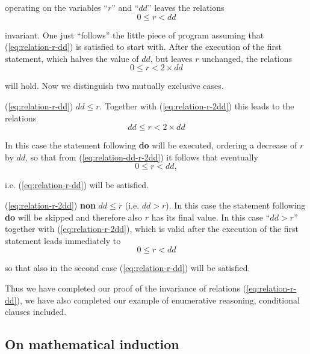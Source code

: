 \noindent
operating on the variables ``$r$'' and ``$dd$'' leaves the relations
\begin{equation}
	\label{eq:relation-r-dd}
	0 \leqslant r < dd
\end{equation}

\noindent
invariant. One just ``follows'' the little piece of program assuming that (\ref{eq:relation-r-dd}) is satisfied to start with. After the execution of the first statement, which halves the value of $dd$, but leaves $r$ unchanged, the relations
\begin{equation}
	\label{eq:relation-r-2dd}
	0 \leqslant r < 2\times dd
\end{equation}

\noindent
will hold. Now we distinguish two mutually exclusive cases.

(\ref{eq:relation-r-dd}) $dd \leqslant r$. Together with (\ref{eq:relation-r-2dd}) this leads to the relations
\begin{equation}
	\label{eq:relation-dd-r-2dd}
	dd \leqslant r < 2\times dd
\end{equation}

\noindent
In this case the statement following \textbf{do} will be executed, ordering a decrease of $r$ by $dd$, so that from (\ref{eq:relation-dd-r-2dd}) it follows that eventually
\begin{equation*}
	0 \leqslant r < dd,
\end{equation*}

\noindent
i.e. (\ref{eq:relation-r-dd}) will be satisfied.

(\ref{eq:relation-r-2dd}) \textbf{non} $dd \leqslant r$ (i.e. $dd > r$). In this case the statement following \textbf{do} will be skipped and therefore also $r$ has its final value. In this case ``$dd > r$'' together with (\ref{eq:relation-r-2dd}), which is valid after the execution of the first statement leads immediately to
\begin{equation*}
	0 \leqslant r < dd
\end{equation*}

\noindent
so that also in the second case (\ref{eq:relation-r-dd}) will be satisfied.

Thus we have completed our proof of the invariance of relations (\ref{eq:relation-r-dd}), we have also completed our example of enumerative reasoning, conditional clauses included.

\subsection{On mathematical induction}
\label{subsec:mathematical-induction}

